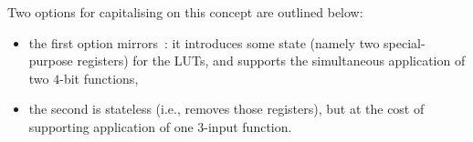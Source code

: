 Two options for capitalising on this concept are outlined below:

\begin{itemize}
\item the first option mirrors~\cite{SCARV:GraGroPag:08}:
      it introduces some state (namely two special-purpose registers)
      for the LUTs, and supports the simultaneous application of two 
      $4$-bit functions,
\item the second is stateless (i.e., removes those registers), but at 
      the cost of supporting application of one $3$-input function.
\end{itemize}

